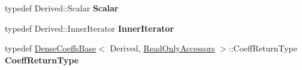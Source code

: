 \begin{DoxyCompactItemize}
typedef Derived\+::\+Scalar {\bfseries Scalar}
\item 
\mbox{\label{struct_eigen_1_1internal_1_1evaluator_3_01_sparse_compressed_base_3_01_derived_01_4_01_4_abc5d24ea2cacb1f9fa79e7e936e70816}} 
typedef Derived\+::\+Inner\+Iterator {\bfseries Inner\+Iterator}
\item 
\mbox{\label{struct_eigen_1_1internal_1_1evaluator_3_01_sparse_compressed_base_3_01_derived_01_4_01_4_a6a09f2251fbe97b764aedfe9a05a19d7}} 
typedef \hyperlink{class_eigen_1_1_dense_coeffs_base}{Dense\+Coeffs\+Base}$<$ Derived, \hyperlink{group__enums_gga9f93eac38eb83deb0e8dbd42ddf11d5da42865f87356ad7e585a1bfbfd1b81699}{Read\+Only\+Accessors} $>$\+::Coeff\+Return\+Type {\bfseries Coeff\+Return\+Type}
\end{DoxyCompactItemize}
